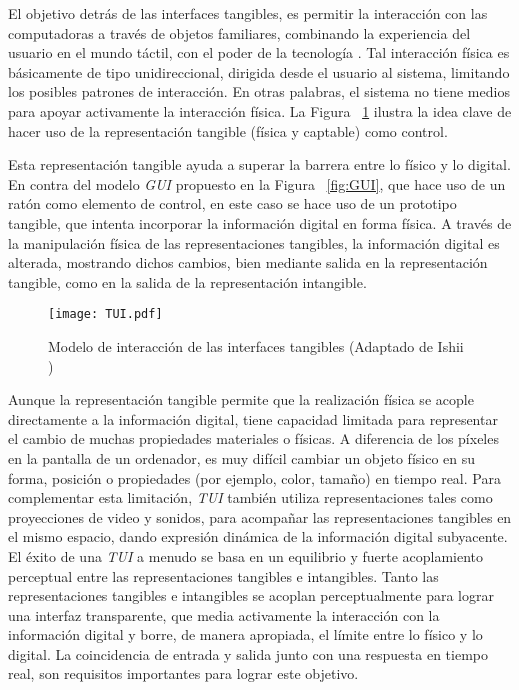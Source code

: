 El objetivo detrás de las interfaces tangibles, es permitir la interacción con las computadoras a través de objetos familiares, combinando la experiencia del usuario en el mundo táctil, con el poder de la tecnología \cite{Ishii}.
Tal interacción física es básicamente de tipo unidireccional, dirigida desde el usuario al sistema, limitando los posibles patrones de interacción. En otras palabras, el sistema no tiene medios para apoyar activamente la interacción física.
La Figura ~\ref{fig:TUI} ilustra la idea clave de hacer uso de la representación tangible (física y captable) como control.

Esta representación tangible ayuda a superar la barrera entre lo físico y lo digital. En contra del modelo \emph{GUI} propuesto en la Figura ~\ref{fig:GUI}, que hace uso de un ratón como elemento de control, en este caso se hace uso de un prototipo tangible, que intenta incorporar la información digital en forma física. A través de la manipulación física de las representaciones tangibles, la información digital es alterada, mostrando dichos cambios, bien mediante salida en la representación tangible, como en la salida de la representación intangible.


\begin{figure}[!h]
\begin{center}
\texttt{[image: TUI.pdf]}
\caption{Modelo de interacción de las interfaces tangibles (Adaptado de Ishii \cite{Ishii})}
\label{fig:TUI}
\end{center}
\end{figure}


Aunque la representación tangible permite que la realización física se acople directamente a la información digital, tiene capacidad limitada para representar el cambio de muchas propiedades materiales o físicas. A diferencia de los píxeles en la pantalla de un ordenador, es muy difícil cambiar un objeto físico en su forma, posición o propiedades (por ejemplo, color, tamaño) en tiempo real. Para complementar esta limitación, \emph{TUI} también utiliza representaciones tales como proyecciones de video y sonidos, para acompañar las representaciones tangibles en el mismo espacio, dando expresión dinámica de la información digital subyacente.
El éxito de una \emph{TUI} a menudo se basa en un equilibrio y fuerte acoplamiento perceptual entre las representaciones tangibles e intangibles. Tanto las representaciones tangibles e intangibles se acoplan perceptualmente para lograr una interfaz transparente, que media activamente la interacción con la información digital y borre, de manera apropiada, el límite entre lo físico y lo digital. La coincidencia de entrada y salida junto con una respuesta en tiempo real, son requisitos importantes para lograr este objetivo.

